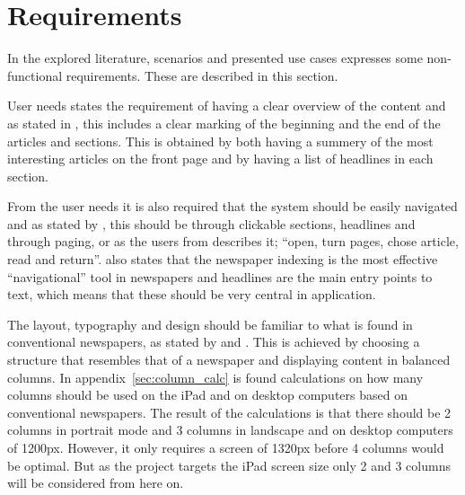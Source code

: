 \section{Requirements}
In the explored literature, scenarios and presented use cases expresses some non-functional requirements. These are described in this section.

User needs states the requirement of having a clear overview of the content and as stated in \cite{FULLTEXT01.pdf}, this includes a clear marking of the beginning and the end of the articles and sections. This is obtained by both having a summery of the most interesting articles on the front page and by having a list of headlines in each section.

From the user needs it is also required that the system should be easily navigated and as stated by \cite{kristin_fredrik.pdf}, this should be through clickable sections, headlines and through paging, or as the users from \cite{FULLTEXT01.pdf} describes it; ``open, turn pages, chose article, read and return''. \cite{FULLTEXT01.pdf} also states that the newspaper indexing is the most effective ``navigational'' tool in newspapers and headlines are the main entry points to text, which means that these should be very central in application.

The layout, typography and design should be familiar to what is found in conventional newspapers, as stated by \cite{FULLTEXT01.pdf} and \cite{hcii2005_1004.pdf}. This is achieved by choosing a structure that resembles that of a newspaper and displaying content in balanced columns. In appendix~\vref{sec:column_calc} is found calculations on how many columns should be used on the iPad and on desktop computers based on conventional newspapers. The result of the calculations is that there should be 2 columns in portrait mode and 3 columns in landscape and on desktop computers of 1200px. However, it only requires a screen of 1320px before 4 columns would be optimal. But as the project targets the iPad screen size only 2 and 3 columns will be considered from here on.

